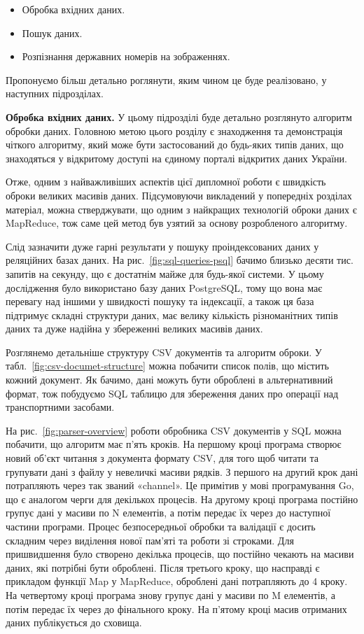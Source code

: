 \begin{itemize}
  \item Обробка вхідних даних.
  \item Пошук даних.
  \item Розпізнання державних номерів на зображеннях.
\end{itemize}

Пропонуємо більш детально роглянути, яким чином це буде реалізовано,
у наступних підрозділах.

\textbf{Обробка вхідних даних.}
У цьому підрозділі буде детально розглянуто алгоритм обробки даних.
Головною метою цього розділу є знаходження та демонстрація чіткого алгоритму,
який може бути застосований до будь-яких типів даних, що знаходяться у відкритому доступі
на єдиному порталі відкритих даних України.

Отже, одним з найважливіших аспектів цієї дипломної роботи є швидкість оброки великих масивів даних.
Підсумовуючи викладений у попередніх розділах матеріал, можна стверджувати, що одним
з найкращих технологій оброки даних є MapReduce, тож саме цей метод був узятий за основу розробленого алгоритму.

Слід зазначити дуже гарні результати у пошуку проіндексованих даних
у реляційних базах даних.
На рис.~\ref{fig:sql-queries-psql} бачимо близько десяти тис. запитів на секунду,
що є достатнім майже для будь-якої системи.
У цьому дослідження було використано базу даних PostgreSQL,
тому що вона має перевагу над іншими у швидкості пошуку та індексації,
а також ця база підтримує складні структури даних,
має велику кількість різноманітних типів даних та
дуже надійна у збереженні великих масивів даних.

Розглянемо детальніше структуру CSV документів та алгоритм оброки.
У табл.~\ref{fig:csv-documet-structure} можна побачити список полів, що містить кожний документ.
Як бачимо, дані можуть бути оброблені в альтернативний формат, тож побудуємо
SQL таблицю для збереження даних про операції над транспортними засобами.

На рис.~\ref{fig:parser-overview} роботи обробника CSV документів у SQL можна побачити, що алгоритм має п'ять кроків.
На першому кроці програма створює новий об'єкт читання з документа формату CSV, для того щоб читати та групувати дані з файлу у невеличкі масиви рядків.
З першого на другий крок дані потрапляють через так званий «channel».
Це примітив у мові програмування Go, що є аналогом черги для декількох процесів.
На другому кроці програма постійно групує дані у масиви по N елементів, а потім передає їх через до наступної частини програми.
Процес безпосередньої обробки та валідації є досить складним через виділення нової пам'яті та роботи зі строками.
Для пришвидшення було створено декілька процесів, що постійно чекають на масиви даних, які потрібні бути оброблені.
Після третього кроку, що насправді є прикладом функції Map у MapReduce, оброблені дані потрапляють до 4 кроку.
На четвертому кроці програма знову групує дані у масиви по M елементів, а потім передає їх через до фінального кроку.
На п'ятому кроці масив отриманих даних публікується до сховища.

